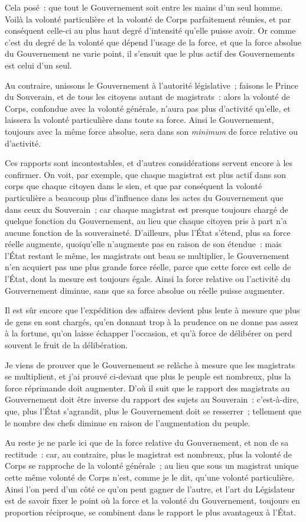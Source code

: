 \documentclass[french,twoside]{book} %
\begin{document}
Cela posé : que tout le Gouvernement soit entre les mains d’un seul homme. Voilà la volonté particulière et la volonté de Corps parfaitement réunies, et par conséquent celle-ci au plus haut degré d’intensité qu’elle puisse avoir. Or comme c’est du degré de la volonté que dépend l’usage de la force, et que la force absolue du Gouvernement ne varie point, il s’ensuit que le plus actif des Gouvernements est celui d’un seul.\par
Au contraire, unissons le Gouvernement à l’autorité législative ; faisons le Prince du Souverain, et de tous les citoyens autant de magistrats : alors la volonté de Corps, confondue avec la volonté générale, n’aura pas plus d’activité qu’elle, et laissera la volonté particulière dans toute sa force. Ainsi le Gouvernement, toujours avec la même force absolue, sera dans son {\itshape minimum} de force relative ou d’activité.\par
Ces rapports sont incontestables, et d’autres considérations servent encore à les confirmer. On voit, par exemple, que chaque magistrat est plus actif dans son corps que chaque citoyen dans le sien, et que par conséquent la volonté particulière a beaucoup plus d’influence dans les actes du Gouvernement que dans ceux du Souverain ; car chaque magistrat est presque toujours chargé de quelque fonction du Gouvernement, au lieu que chaque citoyen pris à part n’a aucune fonction de la souveraineté. D’ailleurs, plus l’État s’étend, plus sa force réelle augmente, quoiqu’elle n’augmente pas en raison de son étendue : mais l’État restant le même, les magistrats ont beau se multiplier, le Gouvernement n’en acquiert pas une plus grande force réelle, parce que cette force est celle de l’État, dont la mesure est toujours égale. Ainsi la force relative ou l’activité du Gouvernement diminue, sans que sa force absolue ou réelle puisse augmenter.\par
Il est sûr encore que l’expédition des affaires devient plus lente à mesure que plus de gens en sont chargés, qu’en donnant trop à la prudence on ne donne pas assez à la fortune, qu’on laisse échapper l’occasion, et qu’à force de délibérer on perd souvent le fruit de la délibération.\par
Je viens de prouver que le Gouvernement se relâche à mesure que les magistrats se multiplient, et j’ai prouvé ci-devant que plus le peuple est nombreux, plus la force réprimande doit augmenter. D’où il suit que le rapport des magistrats au Gouvernement doit être inverse du rapport des sujets au Souverain : c’est-à-dire, que, plus l’État s’agrandit, plus le Gouvernement doit se resserrer ; tellement que le nombre des chefs diminue en raison de l’augmentation du peuple.\par
Au reste je ne parle ici que de la force relative du Gouvernement, et non de sa rectitude : car, au contraire, plus le magistrat est nombreux, plus la volonté de Corps se rapproche de la volonté générale ; au lieu que sous un magistrat unique cette même volonté de Corps n’est, comme je le dit, qu’une volonté particulière. Ainsi l’on perd d’un côté ce qu’on peut gagner de l’autre, et l’art du Législateur est de savoir fixer le point où la force et la volonté du Gouvernement, toujours en proportion réciproque, se combinent dans le rapport le plus avantageux à l’État.
\end{document}
